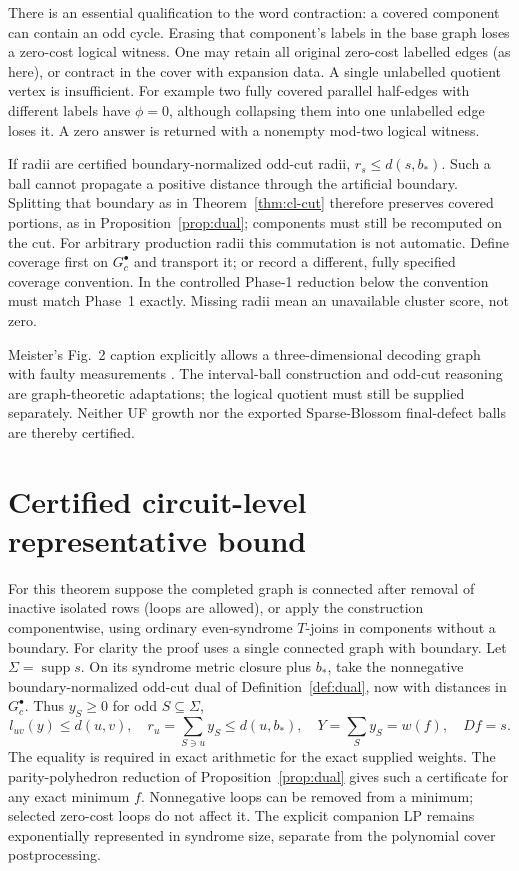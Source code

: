 There is an essential qualification to the word contraction: a covered
component can contain an odd cycle. Erasing that component's labels in
the base graph loses a zero-cost logical witness. One may retain all
original zero-cost labelled edges (as here), or contract in the cover with
expansion data. A single unlabelled quotient vertex is insufficient.
For example two fully covered parallel half-edges with different labels
have $\phi=0$, although collapsing them into one unlabelled edge loses it.
A zero answer is returned with a nonempty mod-two logical witness.

If radii are certified boundary-normalized odd-cut radii, $r_s\le d(s,b_*)$.
Such a ball cannot propagate a positive distance through the artificial
boundary. Splitting that boundary as in Theorem~\ref{thm:cl-cut} therefore
preserves covered portions, as in Proposition~\ref{prop:dual}; components
must still be recomputed on the cut. For arbitrary production radii this
commutation is not automatic. Define coverage first on $G_c^\bullet$ and
transport it; or record a different, fully specified coverage convention.
In the controlled Phase-1 reduction below the convention must match
Phase~1 exactly. Missing radii mean an unavailable cluster score, not zero.

Meister's Fig.~2 caption explicitly allows a three-dimensional decoding
graph with faulty measurements \cite[p.~6]{Meister}. The interval-ball
construction and odd-cut reasoning are graph-theoretic adaptations;
the logical quotient must still be supplied separately. Neither UF growth
nor the exported Sparse-Blossom final-defect balls are thereby certified.

\section{Certified circuit-level representative bound}
\label{sec:cl-gap}
For this theorem suppose the completed graph is connected after removal
of inactive isolated rows (loops are allowed), or apply the construction
componentwise, using ordinary even-syndrome $T$-joins in components
without a boundary. For clarity the proof uses a single connected graph
with boundary. Let $\Sigma=\operatorname{supp}s$. On its syndrome metric
closure plus $b_*$, take the nonnegative boundary-normalized odd-cut dual
of Definition~\ref{def:dual}, now with distances in $G_c^\bullet$.
Thus $y_S\ge0$ for odd $S\subseteq\Sigma$,
\[
 l_{uv}(y)\le d(u,v),\quad r_u=\sum_{S\ni u}y_S\le d(u,b_*),
 \quad Y=\sum_Sy_S=w(f),\quad Df=s.
\]
The equality is required in exact arithmetic for the exact supplied
weights. The parity-polyhedron reduction of Proposition~\ref{prop:dual}
gives such a certificate for any exact minimum $f$. Nonnegative loops
can be removed from a minimum; selected zero-cost loops do not affect it.
The explicit companion LP remains exponentially represented in syndrome
size, separate from the polynomial cover postprocessing.

